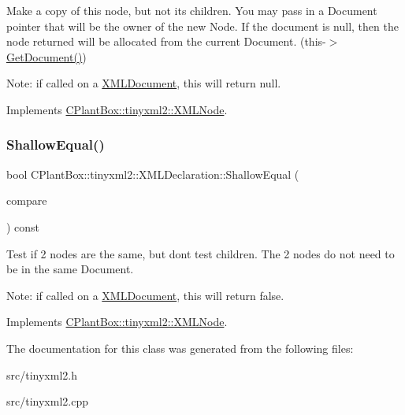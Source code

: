 Make a copy of this node, but not its children. You may pass in a Document pointer that will be the owner of the new Node. If the \textquotesingle{}document\textquotesingle{} is null, then the node returned will be allocated from the current Document. (this-\/$>$\hyperlink{classCPlantBox_1_1tinyxml2_1_1XMLNode_ac0d1a9be320497a51e7a202881a2352e}{Get\+Document()})

Note\+: if called on a \hyperlink{classCPlantBox_1_1tinyxml2_1_1XMLDocument}{X\+M\+L\+Document}, this will return null. 

Implements \hyperlink{classCPlantBox_1_1tinyxml2_1_1XMLNode_a8439e4e87206b26bc03427ffac3e882a}{C\+Plant\+Box\+::tinyxml2\+::\+X\+M\+L\+Node}.

\mbox{\label{classCPlantBox_1_1tinyxml2_1_1XMLDeclaration_a8f02eb489b226d2b508c151334ad7044}} 
\subsubsection{\texorpdfstring{Shallow\+Equal()}{ShallowEqual()}}
{\footnotesize\ttfamily bool C\+Plant\+Box\+::tinyxml2\+::\+X\+M\+L\+Declaration\+::\+Shallow\+Equal (\begin{DoxyParamCaption}\item[{const \hyperlink{classCPlantBox_1_1tinyxml2_1_1XMLNode}{X\+M\+L\+Node} $\ast$}]{compare }\end{DoxyParamCaption}) const\hspace{0.3cm}{\ttfamily [virtual]}}

Test if 2 nodes are the same, but don\textquotesingle{}t test children. The 2 nodes do not need to be in the same Document.

Note\+: if called on a \hyperlink{classCPlantBox_1_1tinyxml2_1_1XMLDocument}{X\+M\+L\+Document}, this will return false. 

Implements \hyperlink{classCPlantBox_1_1tinyxml2_1_1XMLNode_a1019a06dab15152f06f3a879bf9a85c9}{C\+Plant\+Box\+::tinyxml2\+::\+X\+M\+L\+Node}.



The documentation for this class was generated from the following files\+:\begin{DoxyCompactItemize}
\item 
src/tinyxml2.\+h\item 
src/tinyxml2.\+cpp\end{DoxyCompactItemize}
